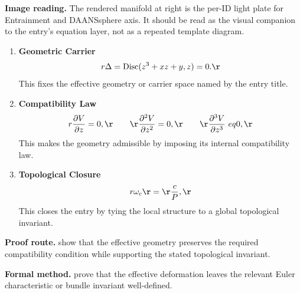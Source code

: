 \begin{samepage}
\noindent\begin{minipage}[t]{0.45\linewidth}
\vspace{0pt}
\raggedright
\scriptsize\textbf{Image reading.} The rendered manifold at right is the per-ID light plate for Entrainment and DAANSsphere axis. It should be read as the visual companion to the entry's equation layer, not as a repeated template diagram.\par
\end{minipage}\hfill
\begin{minipage}[t]{0.53\linewidth}
\vspace*{-0.10in}
\raggedright
{}
\end{minipage}
\end{samepage}

\clearpage


\begin{enumerate}[leftmargin=1.6em,itemsep=9pt,topsep=6pt]
\item \textbf{Geometric Carrier}
\[
r \Delta = \mathrm{Disc}(z^{3} + x z + y, z) = 0.\r
\]
This fixes the effective geometry or carrier space named by the entry title.

\item \textbf{Compatibility Law}
\[
r \frac{\partial V}{\partial z} = 0,\r \qquad\r \frac{\partial^{2} V}{\partial z^{2}} = 0,\r \qquad\r \frac{\partial^{3} V}{\partial z^{3}} \ eq 0,\r
\]
This makes the geometry admissible by imposing its internal compatibility law.

\item \textbf{Topological Closure}
\[
r \omega_{c}\r =\r \frac{c}{P},\r
\]
This closes the entry by tying the local structure to a global topological invariant.
\end{enumerate}

\textbf{Proof route.} show that the effective geometry preserves the required compatibility condition while supporting the stated topological invariant.

\textbf{Formal method.} prove that the effective deformation leaves the relevant Euler characteristic or bundle invariant well-defined.

\medskip
{}

